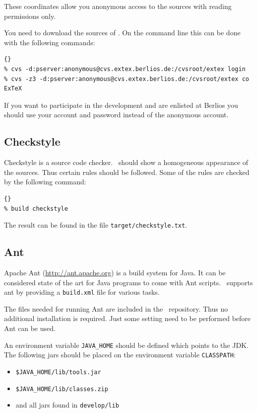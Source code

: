 \documentclass{extex-doc}
\newcommand\File[1]{\texttt{#1}}
\begin{document}
These coordinates allow you anonymous access to the sources with
reading permissions only.

You need to download the sources of \ExTeX. On the command line this
can be done with the following commands:

\begin{lstlisting}{}
% cvs -d:pserver:anonymous@cvs.extex.berlios.de:/cvsroot/extex login
% cvs -z3 -d:pserver:anonymous@cvs.extex.berlios.de:/cvsroot/extex co ExTeX
\end{lstlisting}{}

If you want to participate in the development and are enlisted at
Berlios you should use your account and password instead of the
anonymous account.


\subsection{Checkstyle}

Checkstyle is a source code checker.
\ExTeX\ should show a homogeneous appearance of the sources. Thus
certain rules should be followed. Some of the rules are checked by the
following command:

\begin{lstlisting}{}
% build checkstyle
\end{lstlisting}{}

The result can be found in the file \File{target/checkstyle.txt}.

\subsection{Ant}\label{sec:Ant}

Apache Ant (\url{http://ant.apache.org}) is a build system for Java.
It can be considered state of the art for Java programs to come with
Ant scripts. \ExTeX\ supports ant by providing a \texttt{build.xml}
file for various tasks.

The files needed for running Ant are included in the \ExTeX\
repository. Thus no additional installation is required. Just some
setting need to be performed before Ant can be used.

An environment variable \verb|JAVA_HOME| should be defined which points
to the JDK. The following jars should be placed on the environment
variable \verb|CLASSPATH|:
\begin{itemize}
\item \verb|$JAVA_HOME/lib/tools.jar|
\item \verb|$JAVA_HOME/lib/classes.zip|
\item and all jars found in \File{develop/lib}
\end{itemize}
\end{document}
